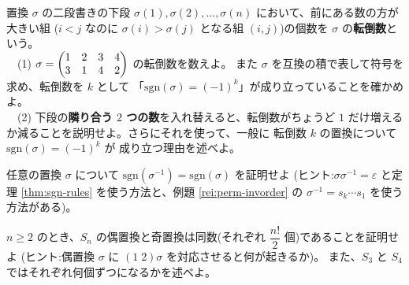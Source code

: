 \begin{mondai}[発展]\label{q:perm-ex10}
置換 $\sigma$ の二段書きの下段 $\sigma(1), \sigma(2), \dots, \sigma(n)$
において、前にある数の方が大きい組
($i < j$ なのに $\sigma(i) > \sigma(j)$ となる組 $(i, j)$)の個数を
$\sigma$ の\textbf{転倒数}という。\\
　(1) $\sigma = \begin{pmatrix}1 & 2 & 3 & 4 \\ 3 & 1 & 4 & 2\end{pmatrix}$ の転倒数を数えよ。
また $\sigma$ を互換の積で表して符号を求め、転倒数を $k$ として
「$\mathrm{sgn}(\sigma) = (-1)^k$」が成り立っていることを確かめよ。\\
　(2) 下段の\textbf{隣り合う $2$ つの数}を入れ替えると、転倒数がちょうど
$1$ だけ増えるか減ることを説明せよ。さらにそれを使って、一般に
転倒数 $k$ の置換について $\mathrm{sgn}(\sigma) = (-1)^k$ が
成り立つ理由を述べよ。
\end{mondai}

\begin{mondai}[証明]\label{q:perm-ex11}
任意の置換 $\sigma$ について
$\mathrm{sgn}(\sigma^{-1}) = \mathrm{sgn}(\sigma)$ を証明せよ
(ヒント:$\sigma\sigma^{-1} = \varepsilon$ と定理 \ref{thm:sgn-rules}
を使う方法と、例題 \ref{rei:perm-invorder} の
$\sigma^{-1} = s_k \cdots s_1$ を使う方法がある)。
\end{mondai}

\begin{mondai}[証明]\label{q:perm-ex12}
$n \ge 2$ のとき、$S_n$ の偶置換と奇置換は同数(それぞれ
$\dfrac{n!}{2}$ 個)であることを証明せよ
(ヒント:偶置換 $\sigma$ に $(1\;2)\sigma$ を対応させると何が起きるか)。
また、$S_3$ と $S_4$ ではそれぞれ何個ずつになるかを述べよ。
\end{mondai}

